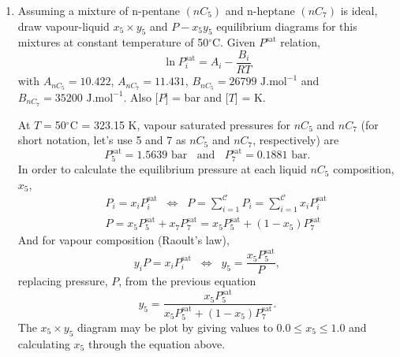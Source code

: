 \documentclass[12pts,a4paper,amsmath,amssymb,floatfix]{article}%
\newcommand{\frc}{\displaystyle\frac}
\newcommand{\summation}[3][error]{\sum\limits_{#2}^{#3}#1}
\begin{document}
\begin{enumerate}[1)] 
   \item\label{Mod04Ex01} Assuming a mixture of n-pentane $\left(nC_{5}\right)$ and n-heptane $\left(nC_{7}\right)$ is ideal, draw vapour-liquid $x_{5}\times y_{5}$ and $P-x_{5}y_{5}$ equilibrium diagrams for this mixtures at constant temperature of 50$^{\circ}$C. Given $P^{\text{sat}}$ relation,
    \begin{displaymath}
      \ln{P_{i}^{\text{sat}}} = A_{i} - \frc{B_{i}}{RT}
    \end{displaymath}
    with $A_{nC_{5}}=10.422$, $A_{nC_{7}}=11.431$, $B_{nC_{5}}=26799 \text{ J.mol}^{-1}$ and $B_{nC_{7}}=35200 \text{ J.mol}^{-1}$. Also [$P$] = bar and [$T$] = K.

  At $T=$50$^{\circ}$C = 323.15 K, vapour saturated pressures for $nC_{5}$ and $nC_{7}$ (for short notation, let's use 5 and 7 as $nC_{5}$ and $nC_{7}$, respectively) are
           \begin{displaymath}
              P_{5}^{\text{sat}} = 1.5639\text{ bar}\;\;\text{ and }\;\;P_{7}^{\text{sat}} = 0.1881\text{ bar}.
           \end{displaymath}
           In order to calculate the equilibrium pressure at each liquid $nC_{5}$ composition, $x_{5}$,
           \begin{eqnarray}
               && P_{i} = x_{i}P_{i}^{\text{sat}} \;\;\Longleftrightarrow \;\; P = \summation[P_{i}]{i=1}{\mathcal{C}} = \summation[x_{i}P_{i}^{\text{sat}}]{i=1}{\mathcal{C}} \nonumber \\
               && P = x_{5}P_{5}^{\text{sat}} + x_{7}P_{7}^{\text{sat}} = x_{5}P_{5}^{\text{sat}} + \left(1-x_{5}\right)P_{7}^{\text{sat}} \nonumber 
           \end{eqnarray}
           And for vapour composition (Raoult's law),
           \begin{displaymath}
               y_{i} P = x_{i}P_{i}^{\text{sat}}  \;\;\Longleftrightarrow \;\; y_{5} = \frc{x_{5}P_{5}^{\text{sat}}}{P},
           \end{displaymath}
           replacing pressure, $P$, from the previous equation
           \begin{displaymath}
               y_{5} = \frc{x_{5}P_{5}^{\text{sat}}}{x_{5}P_{5}^{\text{sat}} + \left(1-x_{5}\right)P_{7}^{\text{sat}}}.
           \end{displaymath}
           The $x_{5} \times y_{5}$ diagram may be plot by giving values to $0.0\leq x_{5} \leq 1.0$ and calculating $x_{5}$ through the equation above.


\end{enumerate}
\end{document}
